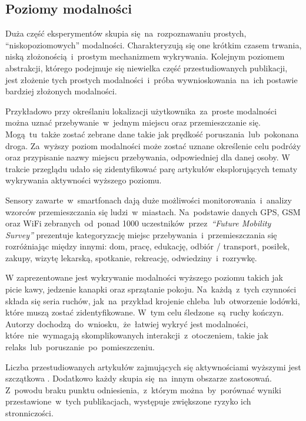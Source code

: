 \subsection{Poziomy modalności}
\label{sec:modality_levels}
Duża część eksperymentów skupia się~na~rozpoznawaniu prostych, ``niskopoziomowych'' modalności. Charakteryzują się one krótkim czasem trwania, niską złożonością~i~prostym mechanizmem wykrywania. Kolejnym poziomem abstrakcji, którego podejmuje się niewielka część przestudiowanych publikacji, jest złożenie tych prostych modalności~i~próba wywnioskowania~na~ich postawie bardziej złożonych modalności.

Przykładowo przy określaniu lokalizacji użytkownika~za~proste modalności można uznać przebywanie~w~jednym miejscu oraz przemieszczanie się. Mogą~tu~także zostać zebrane dane takie jak prędkość poruszania~lub~pokonana droga. Za~wyższy poziom modalności może zostać uznane określenie celu podróży oraz przypisanie nazwy miejscu przebywania, odpowiedniej dla danej osoby. W trakcie przeglądu udało się zidentyfikować parę artykułów eksplorujących tematy wykrywania aktywności wyższego poziomu.
\pagebreak

Sensory zawarte~w~smartfonach dają duże możliwości monitorowania~i~analizy wzorców przemieszczania się ludzi~w~miastach. Na~podstawie danych GPS, GSM oraz WiFi zebranych~od~ponad 1000 uczestników~przez~\textit{``Future Mobility Survey''} \cite{S26} prezentuje kategoryzację miejsc przebywania~i~przemieszczania się rozróżniając między innymi: dom, pracę, edukację, odbiór / transport, posiłek, zakupy, wizytę lekarską, spotkanie, rekreację, odwiedziny~i~rozrywkę.

W \cite{S38} zaprezentowane jest wykrywanie modalności wyższego poziomu takich jak picie kawy, jedzenie kanapki oraz sprzątanie pokoju. Na~każdą~z~tych czynności składa się seria ruchów, jak~na~przykład krojenie chleba~lub~otworzenie lodówki, które muszą zostać zidentyfikowane. W~tym celu śledzone~są~ruchy kończyn. Autorzy dochodzą~do~wniosku,~że~łatwiej wykryć jest modalności, które~nie~wymagają skomplikowanych interakcji~z~otoczeniem, takie jak relaks~lub~poruszanie~po~pomieszczeniu.

Liczba przestudiowanych artykułów zajmujących się aktywnościami wyższymi jest szczątkowa \cite{S26,S62,S38,S36}. Dodatkowo każdy skupia się~na~innym obszarze zastosowań. Z~powodu braku punktu odniesienia,~z~którym można~by~porównać wyniki przestawione~w~tych publikacjach, występuje zwiększone ryzyko ich stronniczości. 

